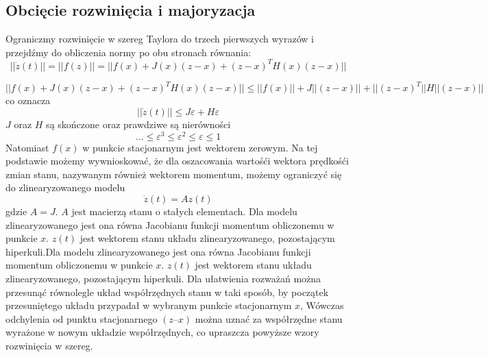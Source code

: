 \documentclass{article}
\begin{document}
	\subsection{Obcięcie rozwinięcia i majoryzacja}
	Ograniczmy rozwinięcie w szereg Taylora do trzech pierwszych wyrazów i przejdźmy do
	obliczenia normy po obu stronach równania:
	\begin{equation}
		||\dot{z}(t)||=||f(z)|| = ||f(x) + J(x)(z-x) + (z-x)^TH(x)(z-x)||
	\end{equation}

	\begin{equation}
		||f(x) + J(x)(z-x) + (z-x)^TH(x)(z-x)|| \leq ||f(x)|| + J||(z-x)|| + ||(z-x)^T||H||(z-x)||
	\end{equation}
	co oznacza 
	\begin{equation}
		||\dot{z}(t)|| \leq J \varepsilon + H \varepsilon 
	\end{equation}
	$J$ oraz $H$ są skończone oraz prawdziwe są nierówności
	\begin{equation}
		... \leq \varepsilon^3 \leq \varepsilon^2 \leq \varepsilon \leq 1
	\end{equation}
	Natomiast $f(x)$ w punkcie stacjonarnym jest wektorem zerowym. Na tej podstawie możemy
	wywnioskować, że dla oszacowania wartośći wektora prędkośći zmian stanu, nazywanym również wektorem momentum, możemy ograniczyć się do zlinearyzowanego modelu
	\begin{equation}
		\dot{z}(t)=Az(t)
	\end{equation}
	gdzie $A=J$.
	$A$ jest macierzą stanu o stałych elementach. Dla modelu zlinearyzowanego jest ona równa
	Jacobianu funkcji momentum obliczonemu w punkcie $x$.
	$z(t)$ jest wektorem stanu układu zlinearyzowanego, pozostającym hiperkuli.Dla modelu zlinearyzowanego jest ona równa
	Jacobianu funkcji momentum obliczonemu w punkcie $x$.
	$z(t)$ jest wektorem stanu układu zlinearyzowanego, pozostającym hiperkuli.
	Dla ułatwienia rozważań można przesunąć równolegle układ współrzędnych stanu w
	taki sposób, by początek przesuniętego układu przypadał w wybranym punkcie
	stacjonarnym $x$, Wówczas odchylenia od punktu stacjonarnego $(z – x)$ można uznać za
	współrzędne stanu wyrażone w nowym układzie współrzędnych, co upraszcza powyższe
	wzory rozwinięcia w szereg.
\end{document}
